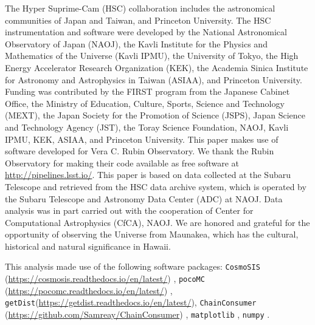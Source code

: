 The Hyper Suprime-Cam (HSC) collaboration includes the astronomical communities of Japan and Taiwan, and Princeton University. The HSC instrumentation and software were developed by the National Astronomical Observatory of Japan (NAOJ), the Kavli Institute for the Physics and Mathematics of the Universe (Kavli IPMU), the University of Tokyo, the High Energy Accelerator Research Organization (KEK), the Academia Sinica Institute for Astronomy and Astrophysics in Taiwan (ASIAA), and Princeton University. Funding was contributed by the FIRST program from the Japanese Cabinet Office, the Ministry of Education, Culture, Sports, Science and Technology (MEXT), the Japan Society for the Promotion of Science (JSPS), Japan Science and Technology Agency (JST), the Toray Science Foundation, NAOJ, Kavli IPMU, KEK, ASIAA, and Princeton University. This paper makes use of software developed for Vera C. Rubin Observatory. We thank the Rubin Observatory for making their code available as free software at \url{http://pipelines.lsst.io/}. This paper is based on data collected at the Subaru Telescope and retrieved from the HSC data archive system, which is operated by the Subaru Telescope and Astronomy Data Center (ADC) at NAOJ. Data analysis was in part carried out with the cooperation of Center for Computational Astrophysics (CfCA), NAOJ. We are honored and grateful for the opportunity of observing the Universe from Maunakea, which has the cultural, historical and natural significance in Hawaii. 

This analysis made use of the following software packages: \texttt{CosmoSIS} (\url{https://cosmosis.readthedocs.io/en/latest/}) \cite{CosmoSISZuntz2015}, \texttt{pocoMC} (\url{https://pocomc.readthedocs.io/en/latest/}) \cite{karamanis2022pocoMC1, karamanis2022pocoMC2}, \texttt{getDist}(\url{https://getdist.readthedocs.io/en/latest/})\cite{getDistLewis2025}, \texttt{ChainConsumer} (\url{https://github.com/Samreay/ChainConsumer}) \cite{ChainConsumer_Hinton2016}, \texttt{matplotlib} \cite{Hunter2007Matplotlib}, \texttt{numpy} \cite{harris2020numpy}.
